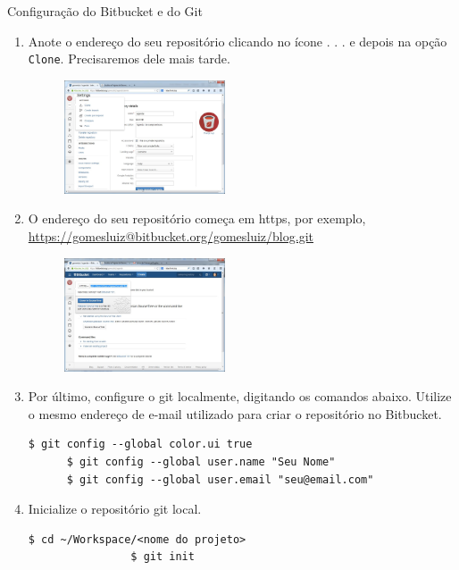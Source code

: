 \begin{frame}{Configuração do Bitbucket e do Git}
\begin{enumerate}
      \framebreak
      \item Anote o endereço do seu repositório clicando no ícone \alert{. . .} e depois
	na opção \verb!Clone!. Precisaremos dele mais tarde.
      \begin{figure}[h!]
	\centering
	\includegraphics[width=0.45\textwidth]{devops/imagens/bitbucket-4.jpg}
      \end{figure}
      
      \framebreak
      \item O endereço do seu repositório começa em https, por exemplo, 
	\url{https://gomesluiz@bitbucket.org/gomesluiz/blog.git}
      \begin{figure}[h!]
	\centering
	\includegraphics[width=0.45\textwidth]{devops/imagens/bitbucket-5.jpg}
      \end{figure}
      
      \framebreak
      \item Por último, configure o git localmente, digitando os comandos abaixo. Utilize
	o \alert{mesmo endereço} de e-mail utilizado para criar o repositório no Bitbucket.
      \begin{lstlisting}[style=BashInputStyle]      
	  $ git config --global color.ui true
	  $ git config --global user.name "Seu Nome"
	  $ git config --global user.email "seu@email.com"
      \end{lstlisting}
      
			\item Inicialize o repositório git local.
			\begin{lstlisting}[style=BashInputStyle]
				$ cd ~/Workspace/<nome do projeto>
				$ git init
			\end{lstlisting}
			

\end{enumerate}
\end{frame}
